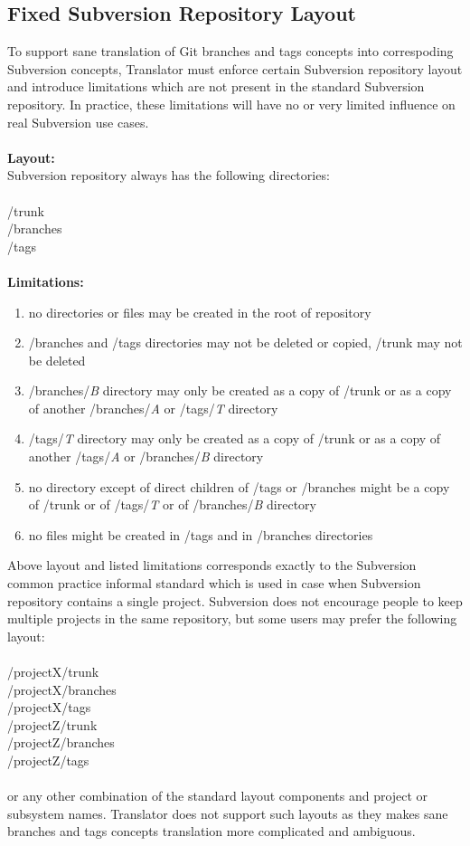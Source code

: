 \subsection{Fixed Subversion Repository Layout}

To support sane translation of Git branches and tags concepts into correspoding Subversion concepts, Translator must enforce certain Subversion repository layout and introduce limitations which are not present in the standard Subversion repository. 
In practice, these limitations will have no or very limited influence on real Subversion use cases.
\\\\
\textbf{Layout:}\\ 
Subversion repository always has the following directories:
\\\\
/trunk\\
/branches\\
/tags\\\\
\textbf{Limitations:}
\begin{enumerate}
\compactlist
\item no directories or files may be created in the root of repository
\item /branches and /tags directories may not be deleted or copied, /trunk may not be deleted
\item /branches/\emph{B} directory may only be created as a copy of /trunk or
as a copy of another /branches/\emph{A} or /tags/\emph{T} directory
\item /tags/\emph{T} directory may only be created as a copy of /trunk or
as a copy of another /tags/\emph{A} or /branches/\emph{B} directory
\item no directory except of direct children of /tags or /branches might be a
copy of /trunk or of /tags/\emph{T} or of /branches/\emph{B} directory
\item no files might be created in /tags and in /branches directories
\end{enumerate}
Above layout and listed limitations corresponds exactly to the Subversion common practice informal standard which
is used in case when Subversion repository contains a single project. Subversion does not encourage people 
to keep multiple projects in the same repository, but some users may prefer the following layout:
\\\\
/projectX/trunk\\
/projectX/branches\\
/projectX/tags\\
/projectZ/trunk\\
/projectZ/branches\\
/projectZ/tags\\\\
or any other combination of the standard layout components and project or subsystem names. Translator does not support such layouts as they 
makes sane branches and tags concepts translation more complicated and ambiguous.
